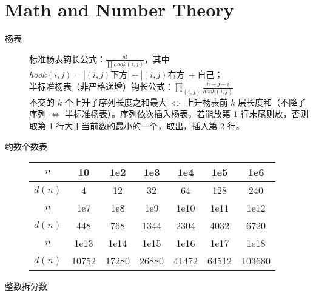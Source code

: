 \documentclass[6pt]{article}
\begin{document}
\begin{multicols}{2}
\begin{lstlisting}
\end{lstlisting}


  \section{Math and Number Theory}

  \begin{description}
    \item[杨表] 标准杨表钩长公式：$\frac{n!}{\prod hook(i,j)}$，其中 $hook(i,j) = |(i,j)\text{下方}| + |(i,j)\text{右方}|+\text{自己}$；\\
          半标准杨表（非严格递增）钩长公式：$\prod_{(i,j)} \frac{n+j-i}{hook(i,j)}$ \\
          不交的 $k$ 个上升子序列长度之和最大 $\Leftrightarrow$ 上升杨表前 $k$ 层长度和（不降子序列 $\Leftrightarrow$ 半标准杨表）。序列依次插入杨表，若能放第 1 行末尾则放，否则取第 1 行大于当前数的最小的一个，取出，插入第 2 行。

    \item[约数个数表]

          \begin{tabular}{@{}|c|cccccc|}
            \hline
            $n$    & 10    & 1e2   & 1e3   & 1e4   & 1e5   & 1e6    \\
            \hline
            $d(n)$ & 4     & 12    & 32    & 64    & 128   & 240    \\
            \hline
            $n$    & 1e7   & 1e8   & 1e9   & 1e10  & 1e11  & 1e12   \\
            \hline
            $d(n)$ & 448   & 768   & 1344  & 2304  & 4032  & 6720   \\
            \hline
            $n$    & 1e13  & 1e14  & 1e15  & 1e16  & 1e17  & 1e18   \\
            \hline
            $d(n)$ & 10752 & 17280 & 26880 & 41472 & 64512 & 103680 \\
            \hline
          \end{tabular}
    \item[整数拆分数]


\end{description}
\end{multicols}
\end{document}
